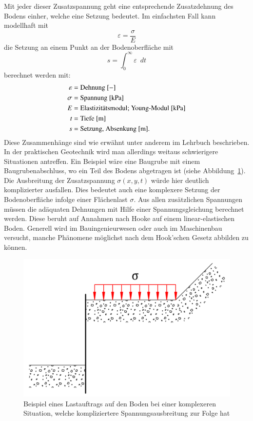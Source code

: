 Mit jeder dieser Zusatzspannung geht eine entsprechende Zusatzdehnung des Bodens einher, welche eine Setzung bedeutet.
%
Im einfachsten Fall kann modellhaft mit
\[
\varepsilon
=
\frac{\sigma}{E}
\]
die Setzung an einem Punkt an der Bodenoberfläche mit
\[
s
=
\int_{0}^{\infty}\varepsilon\enspace dt
\]
berechnet werden mit:
\begin{align*}
	\varepsilon &= \text{Dehnung [$-$]}                                     \\
	     \sigma &= \text{Spannung [\si{\kilo\pascal}]}                      \\
	          E &= \text{Elastizitätsmodul; Young-Modul [\si{\kilo\pascal}]}\\
	          t &= \text{Tiefe [\si{\meter}]}                               \\
	          s &= \text{Setzung, Absenkung [m].}
\end{align*}
Diese Zusammenhänge sind wie erwähnt unter anderem im  Lehrbuch \cite{spannung:Grundlagen-der-Geotechnik} beschrieben.
In der praktischen Geotechnik wird man allerdings weitaus schwierigere Situationen antreffen.
Ein Beispiel wäre eine Baugrube mit einem Baugrubenabschluss, wo ein Teil des Bodens abgetragen ist (siehe Abbildung~\ref{fig:Bild3}).
%
Die Ausbreitung der Zusatzspannung $\sigma(x,y,t)$ würde hier deutlich komplizierter ausfallen.
Dies bedeutet auch eine komplexere Setzung der Bodenoberfläche infolge einer Flächenlast $\sigma$.
Aus allen zusätzlichen Spannungen müssen die adäquaten Dehnungen mit Hilfe einer Spannungsgleichung berechnet werden.
Diese beruht auf Annahmen nach Hooke auf einem linear-elastischen Boden.
Generell wird im Bauingenieurwesen oder auch im Maschinenbau versucht, manche Phänomene möglichst nach dem Hook'schen Gesetz abbilden zu können.

\begin{figure}
	\centering
	\includegraphics[width=0.45\linewidth,keepaspectratio]{papers/spannung/Grafiken/Bild3.png}
	\caption{Beispiel eines Lastauftrags auf den Boden bei einer komplexeren Situation, welche kompliziertere Spannungsausbreitung zur Folge hat}
	\label{fig:Bild3}
\end{figure}
